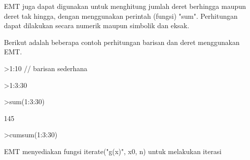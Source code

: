 \documentclass[a4paper,10pt]{article}
\begin{document}
\begin{eulernotebook}
\begin{eulercomment}
\begin{eulercomment}
\begin{eulercomment}
\begin{eulercomment}
\begin{eulercomment}
EMT juga dapat digunakan untuk menghitung jumlah deret berhingga maupun deret tak hingga,
dengan menggunakan perintah (fungsi) "sum". Perhitungan dapat dilakukan secara numerik
maupun simbolik dan eksak.

Berikut adalah beberapa contoh perhitungan barisan dan deret menggunakan EMT.
\end{eulercomment}
\begin{eulerprompt}
>1:10 // barisan sederhana
\end{eulerprompt}
\begin{euleroutput}
  [1,  2,  3,  4,  5,  6,  7,  8,  9,  10]
\end{euleroutput}
\begin{eulerprompt}
>1:3:30
\end{eulerprompt}
\begin{euleroutput}
  [1,  4,  7,  10,  13,  16,  19,  22,  25,  28]
\end{euleroutput}
\begin{eulerprompt}
>sum(1:3:30)
\end{eulerprompt}
\begin{euleroutput}
  145
\end{euleroutput}
\begin{eulerprompt}
>cumsum(1:3:30)
\end{eulerprompt}
\begin{euleroutput}
  [1,  5,  12,  22,  35,  51,  70,  92,  117,  145]
\end{euleroutput}
\begin{eulercomment}
EMT menyediakan fungsi iterate("g(x)", x0, n) untuk melakukan iterasi


\end{eulercomment}
\end{eulercomment}
\end{eulercomment}
\end{eulercomment}
\end{eulercomment}
\end{eulernotebook}
\end{document}
